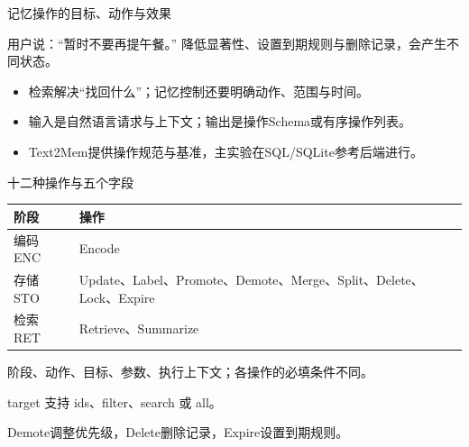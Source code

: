 
\begin{frame}{记忆操作的目标、动作与效果}
    \begin{block}{用户说：“暂时不要再提午餐。”}
        降低显著性、设置到期规则与删除记录，会产生不同状态。
    \end{block}
    \vspace{2mm}
    \begin{itemize}\setlength{\itemsep}{3mm}
        \item 检索解决“找回什么”；记忆控制还要明确动作、范围与时间。
        \item 输入是自然语言请求与上下文；输出是操作Schema或有序操作列表。
        \item Text2Mem提供操作规范与基准，主实验在SQL/SQLite参考后端进行。
    \end{itemize}
\end{frame}

\begin{frame}{十二种操作与五个字段}
    \small
    \begin{tabularx}{\linewidth}{@{}p{20mm}Y@{}}
        \toprule
        阶段 & 操作 \\
        \midrule
        编码 ENC & Encode \\
        存储 STO & Update、Label、Promote、Demote、Merge、Split、Delete、Lock、Expire \\
        检索 RET & Retrieve、Summarize \\
        \bottomrule
    \end{tabularx}\par
    \vspace{3mm}
    \normalsize
    \par
    \vspace{2mm}
    阶段、动作、目标、参数、执行上下文；各操作的必填条件不同。
    \par\vspace{3mm}target 支持 ids、filter、search 或 all。\par
    Demote调整优先级，Delete删除记录，Expire设置到期规则。\par
\end{frame}

